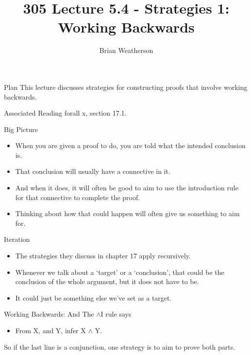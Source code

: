 \documentclass[
  ignorenonframetext,
]{beamer}
\title{305 Lecture 5.4 - Strategies 1: Working Backwards}
\author{Brian Weatherson}
\date{}
\providecommand{\tightlist}{%
  \setlength{\itemsep}{0pt}\setlength{\parskip}{0pt}}
\renewcommand{\,}{\text{, }}
\begin{document}
\frame{\titlepage}

\begin{frame}{Plan}
\protect\hypertarget{plan}{}
This lecture discusses strategies for constructing proofs that involve
working backwards.
\end{frame}

\begin{frame}{Associated Reading}
\protect\hypertarget{associated-reading}{}
forall x, section 17.1.
\end{frame}

\begin{frame}{Big Picture}
\protect\hypertarget{big-picture}{}
\begin{itemize}
\tightlist
\item
  When you are given a proof to do, you are told what the intended
  conclusion is.
\item
  That conclusion will usually have a connective in it.
\item
  And when it does, it will often be good to aim to use the introduction
  rule for that connective to complete the proof.
\item
  Thinking about how that could happen will often give us something to
  aim for.
\end{itemize}
\end{frame}

\begin{frame}{Iteration}
\protect\hypertarget{iteration}{}
\begin{itemize}
\tightlist
\item
  The strategies they discuss in chapter 17 apply recursively.
\item
  Whenever we talk about a `target' or a `conclusion', that could be the
  conclusion of the whole argument, but it does not have to be.
\item
  It could just be something else we've set as a target.
\end{itemize}
\end{frame}

\begin{frame}{Working Backwards: And}
\protect\hypertarget{working-backwards-and}{}
The \(\wedge\)I rule says

\begin{itemize}
\tightlist
\item
  From X, and Y, infer X \(\wedge\) Y.
\end{itemize}

So if the last line is a conjunction, one strategy is to aim to prove
both parts.
\end{frame}
\end{document}
